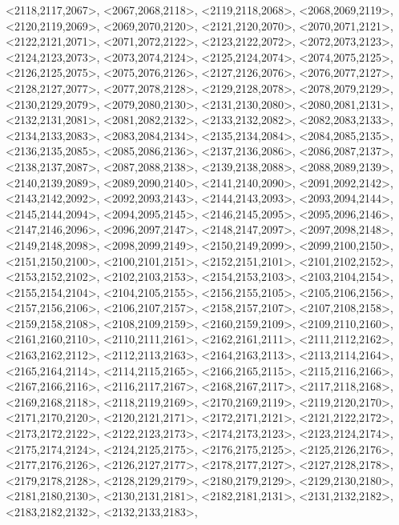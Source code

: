 \documentclass[a4paper,10pt]{article}
\begin{document}
\begin{eulernotebook}
\begin{euleroutput}
  <2118,2117,2067>,
  <2067,2068,2118>,
  <2119,2118,2068>,
  <2068,2069,2119>,
  <2120,2119,2069>,
  <2069,2070,2120>,
  <2121,2120,2070>,
  <2070,2071,2121>,
  <2122,2121,2071>,
  <2071,2072,2122>,
  <2123,2122,2072>,
  <2072,2073,2123>,
  <2124,2123,2073>,
  <2073,2074,2124>,
  <2125,2124,2074>,
  <2074,2075,2125>,
  <2126,2125,2075>,
  <2075,2076,2126>,
  <2127,2126,2076>,
  <2076,2077,2127>,
  <2128,2127,2077>,
  <2077,2078,2128>,
  <2129,2128,2078>,
  <2078,2079,2129>,
  <2130,2129,2079>,
  <2079,2080,2130>,
  <2131,2130,2080>,
  <2080,2081,2131>,
  <2132,2131,2081>,
  <2081,2082,2132>,
  <2133,2132,2082>,
  <2082,2083,2133>,
  <2134,2133,2083>,
  <2083,2084,2134>,
  <2135,2134,2084>,
  <2084,2085,2135>,
  <2136,2135,2085>,
  <2085,2086,2136>,
  <2137,2136,2086>,
  <2086,2087,2137>,
  <2138,2137,2087>,
  <2087,2088,2138>,
  <2139,2138,2088>,
  <2088,2089,2139>,
  <2140,2139,2089>,
  <2089,2090,2140>,
  <2141,2140,2090>,
  <2091,2092,2142>,
  <2143,2142,2092>,
  <2092,2093,2143>,
  <2144,2143,2093>,
  <2093,2094,2144>,
  <2145,2144,2094>,
  <2094,2095,2145>,
  <2146,2145,2095>,
  <2095,2096,2146>,
  <2147,2146,2096>,
  <2096,2097,2147>,
  <2148,2147,2097>,
  <2097,2098,2148>,
  <2149,2148,2098>,
  <2098,2099,2149>,
  <2150,2149,2099>,
  <2099,2100,2150>,
  <2151,2150,2100>,
  <2100,2101,2151>,
  <2152,2151,2101>,
  <2101,2102,2152>,
  <2153,2152,2102>,
  <2102,2103,2153>,
  <2154,2153,2103>,
  <2103,2104,2154>,
  <2155,2154,2104>,
  <2104,2105,2155>,
  <2156,2155,2105>,
  <2105,2106,2156>,
  <2157,2156,2106>,
  <2106,2107,2157>,
  <2158,2157,2107>,
  <2107,2108,2158>,
  <2159,2158,2108>,
  <2108,2109,2159>,
  <2160,2159,2109>,
  <2109,2110,2160>,
  <2161,2160,2110>,
  <2110,2111,2161>,
  <2162,2161,2111>,
  <2111,2112,2162>,
  <2163,2162,2112>,
  <2112,2113,2163>,
  <2164,2163,2113>,
  <2113,2114,2164>,
  <2165,2164,2114>,
  <2114,2115,2165>,
  <2166,2165,2115>,
  <2115,2116,2166>,
  <2167,2166,2116>,
  <2116,2117,2167>,
  <2168,2167,2117>,
  <2117,2118,2168>,
  <2169,2168,2118>,
  <2118,2119,2169>,
  <2170,2169,2119>,
  <2119,2120,2170>,
  <2171,2170,2120>,
  <2120,2121,2171>,
  <2172,2171,2121>,
  <2121,2122,2172>,
  <2173,2172,2122>,
  <2122,2123,2173>,
  <2174,2173,2123>,
  <2123,2124,2174>,
  <2175,2174,2124>,
  <2124,2125,2175>,
  <2176,2175,2125>,
  <2125,2126,2176>,
  <2177,2176,2126>,
  <2126,2127,2177>,
  <2178,2177,2127>,
  <2127,2128,2178>,
  <2179,2178,2128>,
  <2128,2129,2179>,
  <2180,2179,2129>,
  <2129,2130,2180>,
  <2181,2180,2130>,
  <2130,2131,2181>,
  <2182,2181,2131>,
  <2131,2132,2182>,
  <2183,2182,2132>,
  <2132,2133,2183>,

\end{euleroutput}
\end{eulernotebook}
\end{document}
